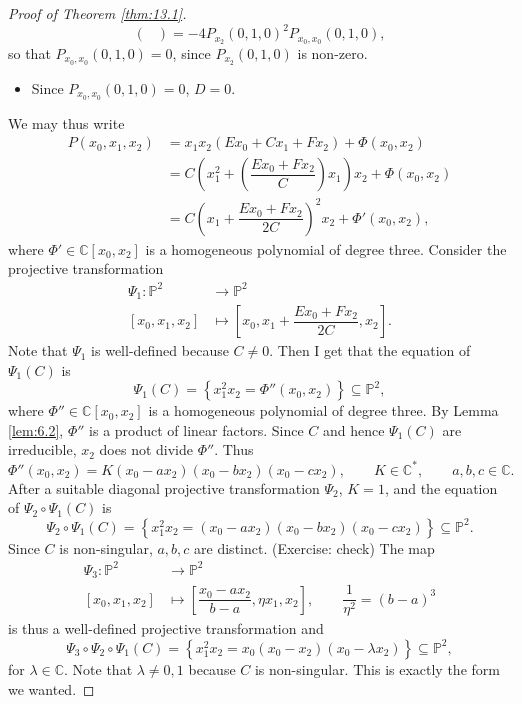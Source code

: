 \documentclass{article}
\newcommand{\C}{\mathbb{C}}
\renewcommand{\P}{\mathbb{P}}
\newcommand{\rb}[1]{\left( #1 \right)}
\renewcommand{\sb}[1]{\left[ #1 \right]}
\newcommand{\cb}[1]{\left\{ #1 \right\}}
\theoremstyle{definition}\newtheorem{definition}{Definition}[section]
\theoremstyle{definition}\newtheorem{notation}[definition]{Notation}
\theoremstyle{definition}\newtheorem{remark}[definition]{Remark}
\theoremstyle{definition}\newtheorem{example1}[definition]{Example}
\theoremstyle{definition}\newtheorem{fact}{Fact}
\theoremstyle{definition}\newtheorem{exercise}{Exercise}
\theoremstyle{definition}\newtheorem*{example2}{Example}
\begin{document}
\begin{proof}[Proof of Theorem \ref{thm:13.1}]
$$\begin{pmatrix}
\end{pmatrix} = -4P_{x_2}\rb{0, 1, 0}^2P_{x_0, x_0}\rb{0, 1, 0}, $$
so that $ P_{x_0, x_0}\rb{0, 1, 0} = 0 $, since $ P_{x_2}\rb{0, 1, 0} $ is non-zero.
\begin{itemize}
\item Since $ P_{x_0, x_0}\rb{0, 1, 0} = 0 $, $ D = 0 $.
\end{itemize}
We may thus write
\begin{align*}
P\rb{x_0, x_1, x_2}
& = x_1x_2\rb{Ex_0 + Cx_1 + Fx_2} + \Phi\rb{x_0, x_2} \\
& = C\rb{x_1^2 + \rb{\dfrac{Ex_0 + Fx_2}{C}}x_1}x_2 + \Phi\rb{x_0, x_2} \\
& = C\rb{x_1 + \dfrac{Ex_0 + Fx_2}{2C}}^2x_2 + \Phi'\rb{x_0, x_2},
\end{align*}
where $ \Phi' \in \C\sb{x_0, x_2} $ is a homogeneous polynomial of degree three. Consider the projective transformation
\begin{align*}
\Psi_1 : \P^2 & \to \P^2 \\
\sb{x_0, x_1, x_2} & \mapsto \sb{x_0, x_1 + \dfrac{Ex_0 + Fx_2}{2C}, x_2}.
\end{align*}
Note that $ \Psi_1 $ is well-defined because $ C \ne 0 $. Then I get that the equation of $ \Psi_1\rb{C} $ is
$$ \Psi_1\rb{C} = \cb{x_1^2x_2 = \Phi''\rb{x_0, x_2}} \subseteq \P^2, $$
where $ \Phi'' \in \C\sb{x_0, x_2} $ is a homogeneous polynomial of degree three. By Lemma \ref{lem:6.2}, $ \Phi'' $ is a product of linear factors. Since $ C $ and hence $ \Psi_1\rb{C} $ are irreducible, $ x_2 $ does not divide $ \Phi'' $. Thus
$$ \Phi''\rb{x_0, x_2} = K\rb{x_0 - ax_2}\rb{x_0 - bx_2}\rb{x_0 - cx_2}, \qquad K \in \C^*, \qquad a, b, c \in \C. $$
After a suitable diagonal projective transformation $ \Psi_2 $, $ K = 1 $, and the equation of $ \Psi_2 \circ \Psi_1\rb{C} $ is
$$ \Psi_2 \circ \Psi_1\rb{C} = \cb{x_1^2x_2 = \rb{x_0 - ax_2}\rb{x_0 - bx_2}\rb{x_0 - cx_2}} \subseteq \P^2. $$
Since $ C $ is non-singular, $ a, b, c $ are distinct. (Exercise: check) The map
\begin{align*}
\Psi_3 : \P^2 & \to \P^2 \\
\sb{x_0, x_1, x_2} & \mapsto \sb{\dfrac{x_0 - ax_2}{b - a}, \eta x_1, x_2}, \qquad \dfrac{1}{\eta^2} = \rb{b - a}^3
\end{align*}
is thus a well-defined projective transformation and
$$ \Psi_3 \circ \Psi_2 \circ \Psi_1\rb{C} = \cb{x_1^2x_2 = x_0\rb{x_0 - x_2}\rb{x_0 - \lambda x_2}} \subseteq \P^2, $$
for $ \lambda \in \C $. Note that $ \lambda \ne 0, 1 $ because $ C $ is non-singular. This is exactly the form we wanted.
\end{proof}
\end{document}
